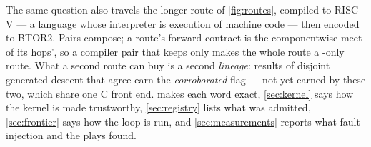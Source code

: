 The same question also travels the longer route of \cref{fig:routes},
compiled to RISC-V --- a language whose interpreter is execution of
machine code --- then encoded to BTOR2. Pairs compose; a route's
forward contract is the componentwise meet of its hops', so a compiler
pair that keeps only  makes the whole route a
-only route. What a second route can buy is a second
\emph{lineage}: results of disjoint generated descent that agree earn
the \emph{corroborated} flag --- not yet earned by these two, which
share one C front end.  makes each word exact, \cref{sec:kernel}
says how the kernel is made trustworthy, \cref{sec:registry} lists
what was admitted, \cref{sec:frontier} says how the loop is run, and
\cref{sec:measurements} reports what fault injection and the plays
found.
